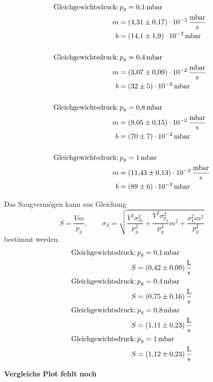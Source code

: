 \begin{align*}
  \text{Gleichgewichtsdruck:} &\, p_g=\SI{0.1}{\milli\bar} \\
  m&= \SI{4.31\pm 0.17 e-3 }{\milli\bar\per\second}\\
  b&=\SI{14.1\pm1.9 e-2}{\milli\bar}\\
  \\
  \text{Gleichgewichtsdruck:} &\, p_g=\SI{0.4}{\milli\bar} \\
  m&= \SI{3.07\pm 0.09 e-2 }{\milli\bar\per\second}\\
  b&=\SI{32\pm5 e-2}{\milli\bar}\\
  \\
  \text{Gleichgewichtsdruck:} &\, p_g=\SI{0.8}{\milli\bar}\\
  m&= \SI{9.05\pm 0.15 e-2 }{\milli\bar\per\second}\\
  b&=\SI{70\pm7 e-2}{\milli\bar}\\
  \\
  \text{Gleichgewichtsdruck:} &\, p_g=\SI{1}{\milli\bar}\\
  m&= \SI{11.43\pm 0.13 e-2 }{\milli\bar\per\second}\\
  b&=\SI{89\pm 6 e-2}{\milli\bar}
\end{align*}

Das Saugvermögen kann aus Gleichung
\begin{equation}
  \label{eq:saug_leck}
  S=\frac{Vm}{p_g}, \qquad \sigma_{S}=\sqrt{\frac{V^{2} \sigma_{m}^{2}}{p_{g}^{2}} + \frac{V^{2} \sigma_{p_{g}}^{2}}{p_{g}^{4}} m^{2} + \frac{\sigma_{V}^{2} m^{2}}{p_{g}^{2}}}
\end{equation}
bestimmt werden.
\begin{align*}
  \text{Gleichgewichtsdruck:} &\, p_g=\SI{0.1}{\milli\bar} \\
  S&=\SI{0.42\pm 0.09}{\litre\per\second}
  \\
  \text{Gleichgewichtsdruck:} &\, p_g=\SI{0.4}{\milli\bar} \\
  S&=\SI{0.75\pm 0.16}{\litre\per\second}
  \\
  \text{Gleichgewichtsdruck:} &\, p_g=\SI{0.8}{\milli\bar}\\
  S&=\SI{1.11\pm 0.23}{\litre\per\second}
  \\
  \text{Gleichgewichtsdruck:} &\, p_g=\SI{1}{\milli\bar}\\
  S&=\SI{1.12\pm 0.23}{\litre\per\second}
\end{align*}

\textbf{Vergleichs Plot fehlt noch}

